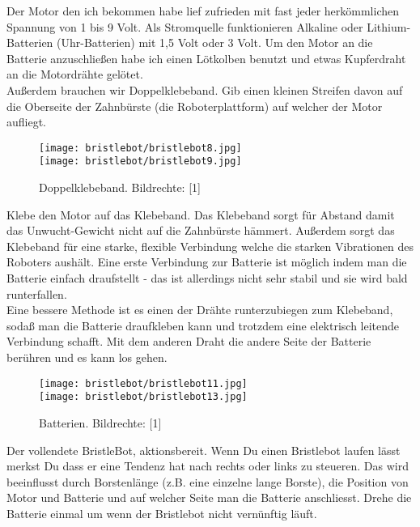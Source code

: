 \documentclass[10pt,a4paper,ngerman,twoside]{article} %
\begin{document}
Der Motor den ich bekommen habe lief zufrieden mit fast jeder herkömmlichen Spannung von 1 bis 9 Volt. Als Stromquelle funktionieren Alkaline oder Lithium-Batterien (Uhr-Batterien) mit 1,5 Volt oder 3 Volt. Um den Motor an die Batterie anzuschließen habe ich einen Lötkolben benutzt und etwas Kupferdraht an die Motordrähte gelötet.
\\ 

Außerdem brauchen wir Doppelklebeband. Gib einen kleinen Streifen davon auf die Oberseite der Zahnbürste (die Roboterplattform) auf welcher der Motor aufliegt. \\ 

\begin{figure}
\texttt{[image: bristlebot/bristlebot8.jpg]}\\
\texttt{[image: bristlebot/bristlebot9.jpg]}\\
\caption{Doppelklebeband. Bildrechte: [1]}
\end{figure}

Klebe den Motor auf das Klebeband. Das Klebeband sorgt für Abstand damit das Unwucht-Gewicht nicht auf die Zahnbürste hämmert. Außerdem sorgt das Klebeband für eine starke, flexible Verbindung welche die starken Vibrationen des Roboters aushält. Eine erste Verbindung zur Batterie ist möglich indem man die Batterie einfach draufstellt - das ist allerdings nicht sehr stabil und sie wird bald runterfallen.
\\ 

Eine bessere Methode ist es einen der Drähte runterzubiegen zum Klebeband, sodaß man die Batterie draufkleben kann und trotzdem eine elektrisch leitende Verbindung schafft. Mit dem anderen Draht die andere Seite der Batterie berühren und es kann los gehen. \\

\begin{figure}
\texttt{[image: bristlebot/bristlebot11.jpg]}\\
\texttt{[image: bristlebot/bristlebot13.jpg]}\\
\caption{Batterien. Bildrechte: [1]}
\end{figure}
Der vollendete BristleBot, aktionsbereit. Wenn Du einen Bristlebot laufen lässt merkst Du dass er eine Tendenz hat nach rechts oder links zu steueren. Das wird beeinflusst durch Borstenlänge (z.B. eine einzelne lange Borste), die Position von Motor und Batterie und auf welcher Seite man die Batterie anschliesst. Drehe die Batterie einmal um wenn der Bristlebot nicht vernünftig läuft.
\\  
\end{document}
